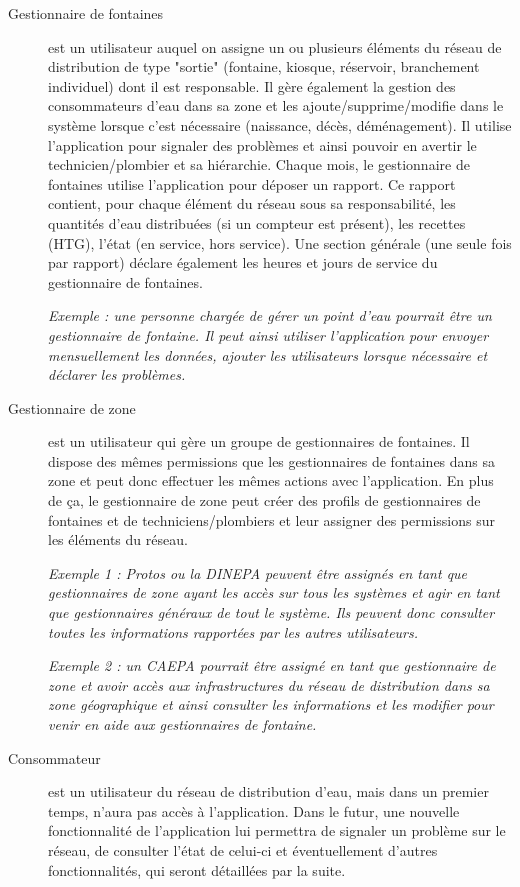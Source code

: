 \documentclass[a4paper, 11pt]{article}
\begin{document}
  \begin{description}
    \item[Gestionnaire de fontaines] est un utilisateur auquel on assigne un ou plusieurs éléments du réseau de distribution de type "sortie" (fontaine, kiosque, réservoir, branchement individuel) dont il est responsable.
    Il gère également la gestion des consommateurs d'eau dans sa zone et les ajoute/supprime/modifie dans le système lorsque c'est nécessaire (naissance, décès, déménagement).
    Il utilise l'application pour signaler des problèmes et ainsi pouvoir en avertir le technicien/plombier et sa hiérarchie. Chaque mois, le gestionnaire de fontaines utilise l'application pour déposer un rapport. Ce rapport contient, pour chaque élément du réseau sous sa responsabilité, les quantités d'eau distribuées (si un compteur est présent), les recettes (HTG), l'état (en service, hors service). Une section générale (une seule fois par rapport) déclare également les heures et jours de service du gestionnaire de fontaines.

    \emph{Exemple : une personne chargée de gérer un point d'eau pourrait être un gestionnaire de fontaine. Il peut ainsi utiliser l'application pour envoyer mensuellement les données, ajouter les utilisateurs lorsque nécessaire et déclarer les problèmes.}

    \item[Gestionnaire de zone] est un utilisateur qui gère un groupe de gestionnaires de fontaines. Il dispose des mêmes permissions que les gestionnaires de fontaines dans sa zone et peut donc effectuer les mêmes actions avec l'application. En plus de ça, le gestionnaire de zone peut créer des profils de gestionnaires de fontaines et de techniciens/plombiers et leur assigner des permissions sur les éléments du réseau. %

    \emph{Exemple 1 : Protos ou la DINEPA peuvent être assignés en tant que gestionnaires de zone ayant les accès sur tous les systèmes et agir en tant que gestionnaires généraux de tout le système. Ils peuvent donc consulter toutes les informations rapportées par les autres utilisateurs.}

    \emph{Exemple 2 : un CAEPA pourrait être assigné en tant que gestionnaire de zone et avoir accès aux infrastructures du réseau de distribution dans sa zone géographique et ainsi consulter les informations et les modifier pour venir en aide aux gestionnaires de fontaine.}

    \item[Consommateur] est un utilisateur du réseau de distribution d'eau, mais dans un premier temps, n'aura pas accès à l'application. Dans le futur, une nouvelle fonctionnalité de l'application lui permettra de signaler un problème sur le réseau, de consulter l'état de celui-ci et éventuellement d'autres fonctionnalités, qui seront détaillées par la suite.


\end{description}
\end{document}
